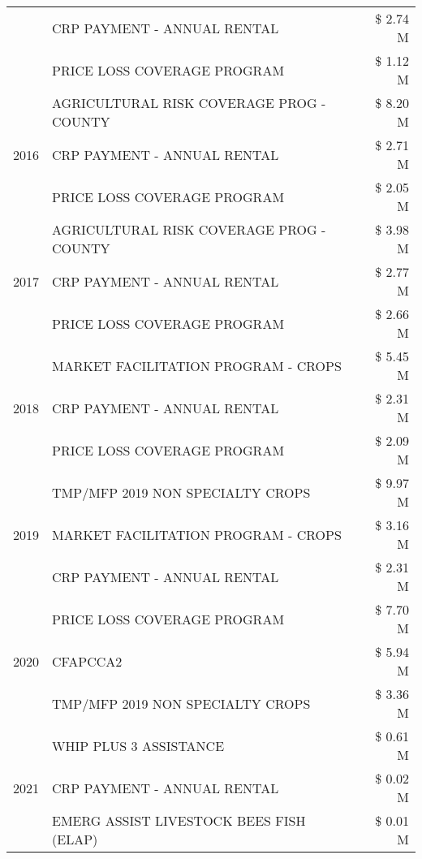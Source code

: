 \begin{tabular}{llr}
 & CRP PAYMENT - ANNUAL RENTAL & \$ 2.74 M \\
 & PRICE LOSS COVERAGE PROGRAM & \$ 1.12 M \\
\cline{1-3}
\multirow[t]{3}{*}{2016} & AGRICULTURAL RISK COVERAGE PROG - COUNTY & \$ 8.20 M \\
 & CRP PAYMENT - ANNUAL RENTAL & \$ 2.71 M \\
 & PRICE LOSS COVERAGE PROGRAM & \$ 2.05 M \\
\cline{1-3}
\multirow[t]{3}{*}{2017} & AGRICULTURAL RISK COVERAGE PROG - COUNTY & \$ 3.98 M \\
 & CRP PAYMENT - ANNUAL RENTAL & \$ 2.77 M \\
 & PRICE LOSS COVERAGE PROGRAM & \$ 2.66 M \\
\cline{1-3}
\multirow[t]{3}{*}{2018} & MARKET FACILITATION PROGRAM - CROPS & \$ 5.45 M \\
 & CRP PAYMENT - ANNUAL RENTAL & \$ 2.31 M \\
 & PRICE LOSS COVERAGE PROGRAM & \$ 2.09 M \\
\cline{1-3}
\multirow[t]{3}{*}{2019} & TMP/MFP 2019 NON SPECIALTY CROPS & \$ 9.97 M \\
 & MARKET FACILITATION PROGRAM - CROPS & \$ 3.16 M \\
 & CRP PAYMENT - ANNUAL RENTAL & \$ 2.31 M \\
\cline{1-3}
\multirow[t]{3}{*}{2020} & PRICE LOSS COVERAGE PROGRAM & \$ 7.70 M \\
 & CFAPCCA2 & \$ 5.94 M \\
 & TMP/MFP 2019 NON SPECIALTY CROPS & \$ 3.36 M \\
\cline{1-3}
\multirow[t]{3}{*}{2021} & WHIP PLUS 3 ASSISTANCE & \$ 0.61 M \\
 & CRP PAYMENT - ANNUAL RENTAL & \$ 0.02 M \\
 & EMERG ASSIST LIVESTOCK BEES FISH (ELAP) & \$ 0.01 M \\
\cline{1-3}
\bottomrule
\end{tabular}
